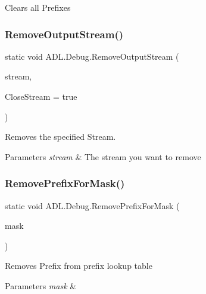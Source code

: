 Clears all Prefixes 

\mbox{\label{class_a_d_l_1_1_debug_a72625a03910e11ca410548f07ecf8e32}} 
\subsubsection{\texorpdfstring{Remove\+Output\+Stream()}{RemoveOutputStream()}}
{\footnotesize\ttfamily static void A\+D\+L.\+Debug.\+Remove\+Output\+Stream (\begin{DoxyParamCaption}\item[{\mbox{\hyperlink{class_a_d_l_1_1_log_stream}{Log\+Stream}}}]{stream,  }\item[{bool}]{Close\+Stream = {\ttfamily true} }\end{DoxyParamCaption})\hspace{0.3cm}{\ttfamily [static]}}



Removes the specified Stream. 


\begin{DoxyParams}{Parameters}
{\em stream} & The stream you want to remove\\
\hline
\end{DoxyParams}
\mbox{\label{class_a_d_l_1_1_debug_a779aa6ed8a563666beeea29b73058a99}} 
\subsubsection{\texorpdfstring{Remove\+Prefix\+For\+Mask()}{RemovePrefixForMask()}}
{\footnotesize\ttfamily static void A\+D\+L.\+Debug.\+Remove\+Prefix\+For\+Mask (\begin{DoxyParamCaption}\item[{int}]{mask }\end{DoxyParamCaption})\hspace{0.3cm}{\ttfamily [static]}}



Removes Prefix from prefix lookup table 


\begin{DoxyParams}{Parameters}
{\em mask} & \\
\hline
\end{DoxyParams}
\mbox{\label{class_a_d_l_1_1_debug_aeee052b6bc6759222ce6ed32dd9763a1}} 
